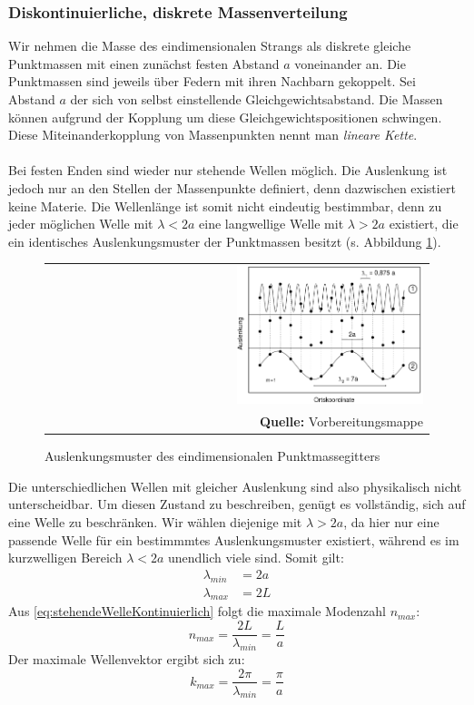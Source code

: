 \documentclass[a4paper,titlepage]{scrartcl}
\numberwithin{equation}{section}
\begin{document}
\subsubsection{Diskontinuierliche, diskrete Massenverteilung}
Wir nehmen die Masse des eindimensionalen Strangs als diskrete gleiche Punktmassen mit einen zunächst festen Abstand $a$ voneinander an. Die Punktmassen sind jeweils über Federn mit ihren Nachbarn gekoppelt. Sei Abstand $a$ der sich von selbst einstellende Gleichgewichtsabstand. Die Massen können aufgrund der Kopplung um diese Gleichgewichtspositionen schwingen. Diese Miteinanderkopplung von Massenpunkten nennt man \emph{lineare Kette}.\\ \\
Bei festen Enden sind wieder nur stehende Wellen möglich. Die Auslenkung ist jedoch nur an den Stellen der Massenpunkte definiert, denn dazwischen existiert keine Materie. Die Wellenlänge ist somit nicht eindeutig bestimmbar, denn zu jeder möglichen Welle mit $\lambda < 2a$ eine langwellige Welle mit $\lambda > 2a$ existiert, die ein identisches Auslenkungsmuster der Punktmassen besitzt (s. Abbildung \ref{fig:diskreteStehendeWelle}).
\begin{figure}[H]
	\centering
	\begin{tabular}{@{}r@{}}
		\includegraphics[width=0.5\textwidth]{stehendewellediskret.png}\\
		\footnotesize\sffamily\textbf{Quelle:} Vorbereitungsmappe \cite{vorbereitungsmappe}
	\end{tabular}
	\caption{Auslenkungsmuster des eindimensionalen Punktmassegitters}
    \label{fig:diskreteStehendeWelle}
\end{figure}
Die unterschiedlichen Wellen mit gleicher Auslenkung sind also physikalisch nicht unterscheidbar. Um diesen Zustand zu beschreiben, genügt es vollständig, sich auf eine Welle zu beschränken. Wir wählen diejenige mit $\lambda > 2a$, da hier nur eine passende Welle für ein bestimmmtes Auslenkungsmuster existiert, während es im kurzwelligen Bereich $\lambda < 2a$ unendlich viele sind. Somit gilt:
\begin{align*}
\lambda_{min}&=2a\\
\lambda_{max}&=2L
\end{align*}
Aus \ref{eq:stehendeWelleKontinuierlich} folgt die maximale Modenzahl $n_{max}$:
\begin{equation*}
n_{max}=\frac{2L}{\lambda_{min}}=\frac{L}{a}
\end{equation*}
Der maximale Wellenvektor ergibt sich zu:
\begin{equation*}
k_{max}=\frac{2 \pi}{\lambda_{min}}=\frac{\pi}{a}
\end{equation*}
\end{document}

